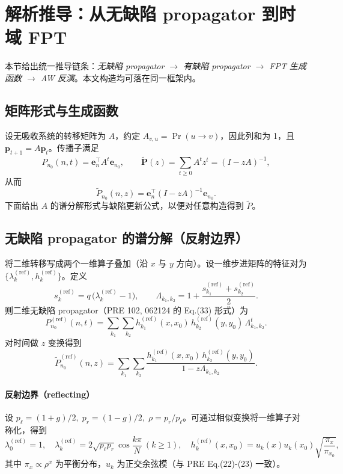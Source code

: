 \documentclass[11pt,fontset=fandol]{ctexart}
\begin{document}
\section{解析推导：从无缺陷 propagator 到时域 FPT}
本节给出统一推导链条：\emph{无缺陷 propagator $\to$ 有缺陷 propagator $\to$ FPT 生成函数 $\to$ AW 反演}。本文构造均可落在同一框架内。

\subsection{矩阵形式与生成函数}
设无吸收系统的转移矩阵为 $A$，约定 $A_{v,u}=\Pr(u\to v)$，因此列和为 1，且 $\mathbf{p}_{t+1}=A\mathbf{p}_t$。传播子满足
\begin{equation}
  P_{n_0}(n,t)=\mathbf{e}_n^\top A^t \mathbf{e}_{n_0},
  \qquad
  \tilde{\mathbf{P}}(z)=\sum_{t\ge 0} A^t z^t=(I-zA)^{-1},
\end{equation}
从而
\begin{equation}
  \tilde P_{n_0}(n,z)=\mathbf{e}_n^\top (I-zA)^{-1}\mathbf{e}_{n_0}.
\end{equation}
下面给出 $A$ 的谱分解形式与缺陷更新公式，以便对任意构造得到 $\tilde P$。

\subsection{无缺陷 propagator 的谱分解（反射边界）}
将二维转移写成两个一维算子叠加（沿 $x$ 与 $y$ 方向）。设一维步进矩阵的特征对为 $\{\lambda_k^{(\text{ref})},h_k^{(\text{ref})}\}$。定义
\begin{equation}
  s_k^{(\text{ref})} = q\,\bigl(\lambda_k^{(\text{ref})}-1\bigr),\qquad
  \Lambda_{k_1,k_2}=1+\frac{s_{k_1}^{(\text{ref})}+s_{k_2}^{(\text{ref})}}{2}.
\end{equation}
则二维无缺陷 propagator（PRE 102, 062124 的 Eq.(33) 形式）为
\begin{equation}
  P^{(\text{ref})}_{n_0}(n,t)=\sum_{k_1}\sum_{k_2} h_{k_1}^{(\text{ref})}(x,x_0)\,h_{k_2}^{(\text{ref})}(y,y_0)\,\Lambda_{k_1,k_2}^t.
  \label{eq:P_time}
\end{equation}
对时间做 $z$ 变换得到
\begin{equation}
  \tilde P^{(\text{ref})}_{n_0}(n,z)=\sum_{k_1}\sum_{k_2}
  \frac{h_{k_1}^{(\text{ref})}(x,x_0)\,h_{k_2}^{(\text{ref})}(y,y_0)}{1-z\Lambda_{k_1,k_2}}.
  \label{eq:P_z}
\end{equation}

\paragraph{反射边界（reflecting）} \;\;
设 $p_\ell=(1+g)/2,\;p_r=(1-g)/2,\;\rho=p_r/p_\ell$。可通过相似变换将一维算子对称化，得到
\begin{equation}
  \lambda_0^{(\text{ref})}=1,\quad
  \lambda_k^{(\text{ref})}=2\sqrt{p_\ell p_r}\cos\frac{k\pi}{N}\ (k\ge 1),\quad
  h_k^{(\text{ref})}(x,x_0)=u_k(x)u_k(x_0)\sqrt{\frac{\pi_x}{\pi_{x_0}}},
\end{equation}
其中 $\pi_x\propto \rho^x$ 为平衡分布，$u_k$ 为正交余弦模（与 PRE Eq.(22)-(23) 一致）。
\end{document}

